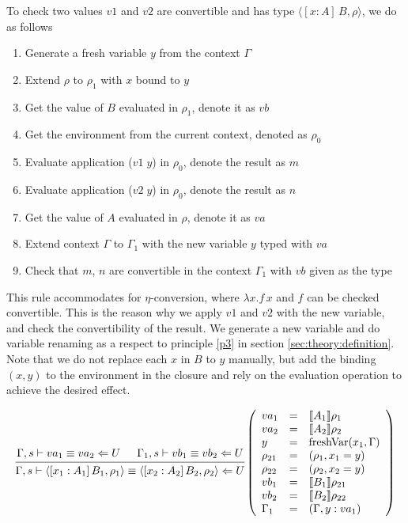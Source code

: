 \documentclass{article}
\theoremstyle{remark}
\begin{document}
To check two values $v1$ and $v2$ are convertible and has type $\langle [x : A] \, B, \rho \rangle$, we do as follows
\begin{enumerate}
\item Generate a fresh variable $y$ from the context $\Gamma$
\item Extend $\rho$ to $\rho_1$ with $x$ bound to $y$ 
\item Get the value of $B$ evaluated in $\rho_1$, denote it as $vb$
\item Get the environment from the current context, denoted as $\rho_0$
\item Evaluate application ($v1 \; y$) in $\rho_0$, denote the result as $m$
\item Evaluate application ($v2 \; y$) in $\rho_0$, denote the result as $n$
\item Get the value of $A$ evaluated in $\rho$, denote it as $va$
\item Extend context $\Gamma$ to $\Gamma_1$ with the new variable $y$ typed with $va$
\item Check that $m$, $n$ are convertible in the context $\Gamma_1$ with $vb$ given as the type
\end{enumerate}

This rule accommodates for $\eta$-conversion, where $\lambda x . f \, x$ and $f$ can be checked convertible. This is the reason why we apply $v1$ and $v2$ with the new variable, and check the convertibility of the result. We generate a new variable and do variable renaming as a respect to principle \ref{p3} in section \ref{sec:theory:definition}. Note that we do not replace each $x$ in $B$ to $y$ manually, but add the binding $(x, y)$ to the environment in the closure and rely on the evaluation operation to achieve the desired effect.

\begin{align}
  \begin{prooftree}
    \hypo{\Gamma,s \vdash va_1 \equiv va_2 \Leftarrow U}
    \hypo{\Gamma_1,s \vdash vb_1 \equiv vb_2 \Leftarrow U}
    \infer2{\Gamma,s \vdash \langle [x_1 : A_1] \, B_1, \rho_1 \rangle \equiv \langle [x_2 : A_2] \, B_2, \rho_2 \rangle \Leftarrow U} 
  \end{prooftree}\left(\begin{array}{l l l}
                         va_1 &= & \llbracket A_1 \rrbracket \rho_1 \\ 
                         va_2 &= & \llbracket A_2 \rrbracket \rho_2 \\ 
                         y &= & \text{freshVar}(x_1, \Gamma) \\
                         \rho_{21} &= & (\rho_1, x_1 = y) \\
                         \rho_{22} &= & (\rho_2, x_2 = y) \\
                         vb_1 &= & \llbracket B_1 \rrbracket \rho_{21} \\
                         vb_2 &= & \llbracket B_2 \rrbracket \rho_{22} \\
                         \Gamma_1 &= & (\Gamma, y : va_1)
                       \end{array}\right)
\end{align}
\end{document}

